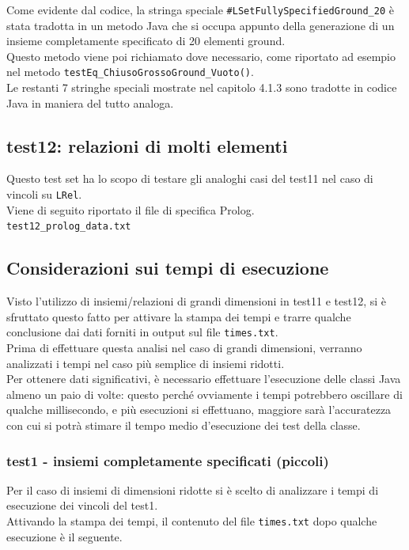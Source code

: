 Come evidente dal codice, la stringa speciale \texttt{#LSetFullySpecifiedGround\_20} è stata tradotta in un metodo Java che si occupa appunto della generazione di un insieme completamente specificato di 20 elementi ground.\\
Questo metodo viene poi richiamato dove necessario, come riportato ad esempio nel metodo \texttt{testEq\_ChiusoGrossoGround\_Vuoto()}.\\

Le restanti 7 stringhe speciali mostrate nel capitolo 4.1.3 sono tradotte in codice Java in maniera del tutto analoga.\\

\subsection{test12: relazioni di molti elementi}
Questo test set ha lo scopo di testare gli analoghi casi del test11 nel caso di vincoli su \texttt{LRel}.\\
Viene di seguito riportato il file di specifica Prolog.\\

\texttt{test12\_prolog\_data.txt}


%

\subsection{Considerazioni sui tempi di esecuzione}

Visto l'utilizzo di insiemi/relazioni di grandi dimensioni in test11 e test12, si è sfruttato questo fatto per attivare la stampa dei tempi e trarre qualche conclusione dai dati forniti in output sul file \texttt{times.txt}.\\

Prima di effettuare questa analisi nel caso di grandi dimensioni, verranno analizzati i tempi nel caso più semplice di insiemi ridotti.\\
Per ottenere dati significativi, è necessario effettuare l'esecuzione delle classi Java almeno un paio di volte: questo perché ovviamente i tempi potrebbero oscillare di qualche millisecondo, e più esecuzioni si effettuano, maggiore sarà l'accuratezza con cui si potrà stimare il tempo medio d'esecuzione dei test della classe.\\

\subsubsection{test1 - insiemi completamente specificati (piccoli)}
Per il caso di insiemi di dimensioni ridotte si è scelto di analizzare i tempi di esecuzione dei vincoli del test1.\\
Attivando la stampa dei tempi, il contenuto del file \texttt{times.txt} dopo qualche esecuzione è il seguente.\\
\clearpage

